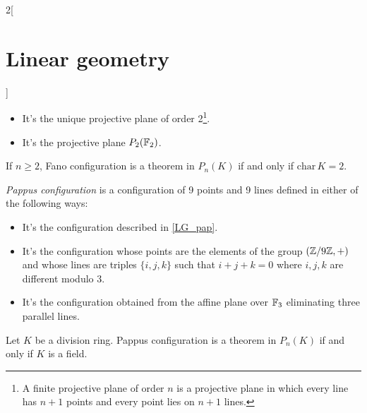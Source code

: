 \documentclass[../../../main.tex]{subfiles}
\begin{document}
\begin{multicols}{2}[\section{Linear geometry}]
\begin{definition}
\begin{itemize}
\begin{center}
            \end{center}
      \item It's the unique projective plane of order 2\footnote{A finite projective plane of order $n$ is a  projective plane in which every line has $n+1$ points and every point lies on $n+1$ lines.}.
      \item It's the projective plane $P_2(\mathbb{F}_2)$.
    \end{itemize}
  \end{definition}
  \begin{theorem}
    If $n\geq 2$, Fano configuration is a theorem in $P_n(K)$ if and only if $\text{char}\,K=2$.
  \end{theorem}
  \begin{definition}
    \emph{Pappus configuration} is a configuration of 9 points and 9 lines defined in either of the following ways:
    \begin{itemize}
      \item It's the configuration described in \cref{LG_pap}.
            \begin{center}
              \begin{minipage}{\linewidth}
                \centering
                
                \label{LG_pap}
              \end{minipage}
            \end{center}
      \item It's the configuration whose points are the elements of the group $(\mathbb{Z} /9\mathbb{Z} ,+)$ and whose lines are triples $\{i,j,k\}$ such that $i+j+k=0$ where $i,j,k$ are different modulo 3.
      \item It's the configuration obtained from the affine plane over $\mathbb{F}_3$ eliminating three parallel lines.
    \end{itemize}
  \end{definition}
  \begin{theorem}
    Let $K$ be a division ring. Pappus configuration is a theorem in $P_n(K)$ if and only if $K$ is a field.
  \end{theorem}

\end{multicols}
\end{document}
